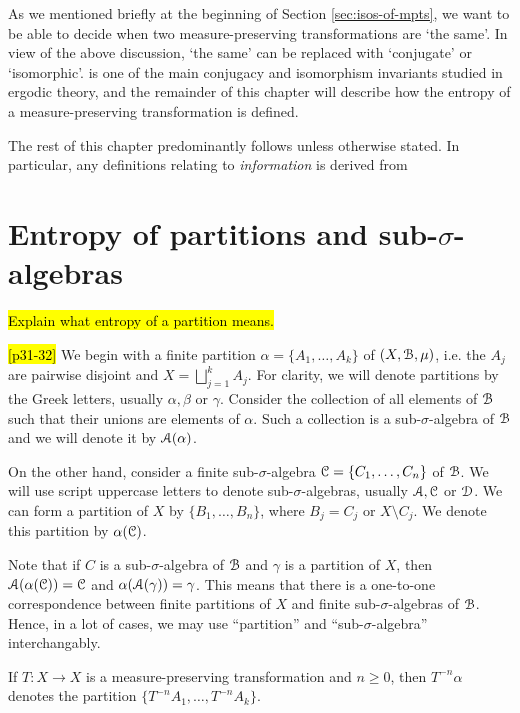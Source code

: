 As we mentioned briefly at the beginning of Section \ref{sec:isos-of-mpts}, we want to be able to decide when two measure-preserving transformations are `the same'. In view of the above discussion, `the same' can be replaced with `conjugate' or `isomorphic'.  is one of the main conjugacy and isomorphism invariants studied in ergodic theory, and the remainder of this chapter will describe how the entropy of a measure-preserving transformation is defined.

The rest of this chapter predominantly follows \cite[Chapter 4]{walters:intro-to-ergodic-theory} unless otherwise stated. In particular, any definitions relating to \emph{information} is derived from \cite[p33-34]{parry-pollicott:zeta-fns-periodic-orbits}

\section{Entropy of partitions and sub-\texorpdfstring{$\sigma$}{sigma}-algebras}
\hl{Explain what entropy of a partition means.}

\hl{[p31-32]} We begin with a finite partition $\alpha = \{A_1, \dots, A_k\}$ of $(X, \mathcal{B}, \mu)$, i.e. the $A_j$ are pairwise disjoint and $X = \bigsqcup_{j = 1}^k{A_j}$. For clarity, we will denote partitions by the Greek letters, usually $\alpha, \beta$ or $\gamma$. Consider the collection of all elements of $\mathcal{B}$ such that their unions are elements of $\alpha$. Such a collection is a sub-$\sigma$-algebra of $\mathcal{B}$ and we will denote it by $\mathcal{A}(\alpha)$.

On the other hand, consider a finite sub-$\sigma$-algebra $\mathcal{C} = \{C_1, \dots, C_n\}$ of $\mathcal{B}$. We will use script uppercase letters to denote sub-$\sigma$-algebras, usually $\mathcal{A}, \mathcal{C}$ or $\mathcal{D}$. We can form a partition of $X$ by $\{B_1, \dots, B_n\}$, where $B_j = C_j$ or $X \setminus C_j$. We denote this partition by $\alpha(\mathcal{C})$.

Note that if $C$ is a sub-$\sigma$-algebra of $\mathcal{B}$ and $\gamma$ is a partition of $X$, then $\mathcal{A}(\alpha(\mathcal{C})) = \mathcal{C}$ and $\alpha(\mathcal{A}(\gamma)) = \gamma$. This means that there is a one-to-one correspondence between finite partitions of $X$ and finite sub-$\sigma$-algebras of $\mathcal{B}$. Hence, in a lot of cases, we may use ``partition'' and ``sub-$\sigma$-algebra'' interchangably.

If $T: X \to X$ is a measure-preserving transformation and $n \geq 0$, then $T^{-n}{\alpha}$ denotes the partition $\{T^{-n}{A_1}, \dots, T^{-n}{A_k}\}$.

